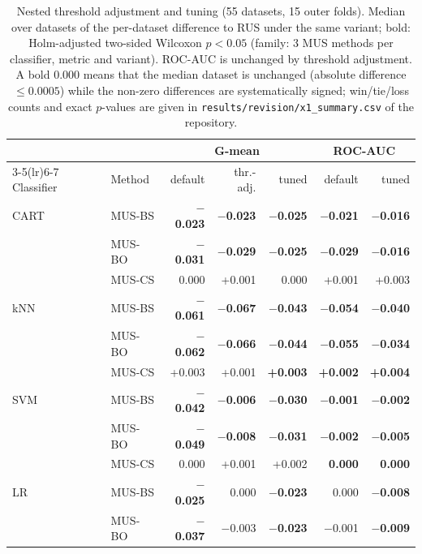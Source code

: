 \begin{table}[htbp]
\centering\footnotesize
\setlength{\tabcolsep}{4pt}
\caption{Nested threshold adjustment and tuning (55 datasets, 15 outer folds). Median over datasets of the per-dataset difference to RUS under the same variant; bold: Holm-adjusted two-sided Wilcoxon $p<0.05$ (family: 3 MUS methods per classifier, metric and variant). ROC-AUC is unchanged by threshold adjustment. A bold 0.000 means that the median dataset is unchanged (absolute difference $\leq 0.0005$) while the non-zero differences are systematically signed; win/tie/loss counts and exact $p$-values are given in \texttt{results/revision/x1\_summary.csv} of the repository.}
\label{tab:x1}
\begin{tabular}{llrrrrr}
\toprule
 & & \multicolumn{3}{c}{G-mean} & \multicolumn{2}{c}{ROC-AUC}\\
\cmidrule(lr){3-5}\cmidrule(lr){6-7}
Classifier & Method & default & thr.-adj. & tuned & default & tuned\\
\midrule
CART & MUS-BS & \textbf{$-$0.023} & \textbf{$-$0.023} & \textbf{$-$0.025} & \textbf{$-$0.021} & \textbf{$-$0.016}\\
 & MUS-BO & \textbf{$-$0.031} & \textbf{$-$0.029} & \textbf{$-$0.025} & \textbf{$-$0.029} & \textbf{$-$0.016}\\
 & MUS-CS & 0.000 & +0.001 & 0.000 & +0.001 & +0.003\\
\addlinespace
kNN & MUS-BS & \textbf{$-$0.061} & \textbf{$-$0.067} & \textbf{$-$0.043} & \textbf{$-$0.054} & \textbf{$-$0.040}\\
 & MUS-BO & \textbf{$-$0.062} & \textbf{$-$0.066} & \textbf{$-$0.044} & \textbf{$-$0.055} & \textbf{$-$0.034}\\
 & MUS-CS & +0.003 & +0.001 & \textbf{+0.003} & \textbf{+0.002} & \textbf{+0.004}\\
\addlinespace
SVM & MUS-BS & \textbf{$-$0.042} & \textbf{$-$0.006} & \textbf{$-$0.030} & \textbf{$-$0.001} & \textbf{$-$0.002}\\
 & MUS-BO & \textbf{$-$0.049} & \textbf{$-$0.008} & \textbf{$-$0.031} & \textbf{$-$0.002} & \textbf{$-$0.005}\\
 & MUS-CS & 0.000 & +0.001 & +0.002 & \textbf{0.000} & \textbf{0.000}\\
\addlinespace
LR & MUS-BS & \textbf{$-$0.025} & 0.000 & \textbf{$-$0.023} & 0.000 & \textbf{$-$0.008}\\
 & MUS-BO & \textbf{$-$0.037} & $-$0.003 & \textbf{$-$0.023} & $-$0.001 & \textbf{$-$0.009}\\

\end{tabular}
\end{table}
